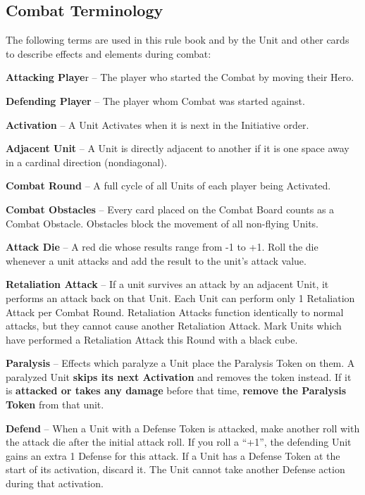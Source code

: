 \begin{multicols}{2}
\subsection*{\hypertarget{Combatterminology}{Combat Terminology}}
The following terms are used in this rule book and by the Unit and other cards to describe effects and elements during combat:\par
\textbf{Attacking Playe}r – The player who started the Combat by moving their Hero.\par
\textbf{Defending Player} – The player whom Combat was started against.\par
\textbf{Activation} – A Unit Activates when it is next in the Initiative order.\par
\textbf{Adjacent Unit} – A Unit is directly adjacent to another if it is one space away in a cardinal direction (nondiagonal).\par
\textbf{Combat Round} – A full cycle of all Units of each player being Activated.\par
\textbf{Combat Obstacles} – Every card placed on the Combat Board counts as a Combat Obstacle.
Obstacles block the movement of all non-flying Units.\par
\textbf{Attack Die} – A red die whose results range from -1 to +1.
Roll the die whenever a unit attacks and
add the result to the unit's attack value.\par
\textbf{\hypertarget{Retaliate}{Retaliation Attack}} – If a unit survives an attack by an adjacent Unit, it performs an attack back on that Unit.
Each Unit can perform only 1 Retaliation Attack per Combat Round.
Retaliation Attacks function identically to normal attacks, but they cannot cause another Retaliation Attack.
Mark Units which have performed a Retaliation Attack this Round with a black cube.\par
\textbf{Paralysis}  – Effects which paralyze a Unit place the Paralysis Token on them.
A paralyzed Unit \textbf{skips its next Activation} and removes the token instead.
If it is \textbf{attacked or takes any damage} before that time, \textbf{remove the Paralysis Token} from that unit.\par
\textbf{\hypertarget{Defend}{Defend}}  – When a Unit with a Defense Token is attacked, make another roll with the attack die
after the initial attack roll.
If you roll a “+1”, the defending Unit gains an extra 1 Defense for this attack.
If a Unit has a Defense Token at the start of its activation, discard it.
The Unit cannot take another Defense action during that activation.


\end{multicols}
